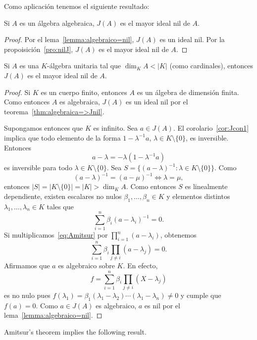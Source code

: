 Como aplicación tenemos el siguiente resultado:

\begin{theorem}
	\label{thm:algebraica=>Jnil}
	Si $A$ es un álgebra algebraica, $J(A)$ es el mayor ideal nil de $A$.
\end{theorem}

\begin{proof}
	Por el lema~\ref{lemma:algebraico=nil}, $J(A)$ es un ideal nil. Por la
	propoisición~\ref{pro:nilJ}, $J(A)$ es el mayor ideal nil de $A$.
\end{proof}

\begin{theorem}[Amitsur]
	\label{thm:Amitsur}
	Si $A$ es una $K$-álgebra unitaria tal que $\dim_KA<|K|$ (como cardinales),
	entonces $J(A)$ es el mayor ideal nil de $A$.
\end{theorem}

\begin{proof}
	Si $K$ es un cuerpo finito, entonces $A$ es un álgebra de dimensión finita.
	Como entonces $A$ es algebraica, $J(A)$ es un ideal nil por el
	teorema~\ref{thm:algebraica=>Jnil}.

	Supongamos entonces que $K$ es infinito. Sea $a\in J(A)$. El
	corolario~\ref{cor:Jcon1} implica que todo elemento de la forma
	$1-\lambda^{-1}a$, $\lambda\in K\setminus\{0\}$, es inversible. Entonces 
	\[
		a-\lambda=-\lambda(1-\lambda^{-1}a)
	\]
	es inversible para todo $\lambda\in K\setminus\{0\}$. Sea
	$S=\{(a-\lambda)^{-1}:\lambda\in K\setminus\{0\}\}$. Como
	\[
	(a-\lambda)^{-1}=(a-\mu)^{-1}\Longleftrightarrow\lambda=\mu,
	\]
	entonces $|S|=|K\setminus\{0\}|=|K|>\dim_KA$. Como entonces $S$ 
	es linealmente dependiente, 
	existen escalares no
	nulos $\beta_1,\dots,\beta_n\in K$ y elementos distintos $\lambda_1,\dots,\lambda_n\in K$ tales que
	\begin{equation}
		\label{eq:Amitsur}
		\sum_{i=1}^n \beta_i(a-\lambda_i)^{-1}=0.
	\end{equation}
	Si multiplicamos~\eqref{eq:Amitsur} por $\prod_{i=1}^n(a-\lambda_i)$, obtenemos
	\[
		\sum_{i=1}^n\beta_i\prod_{j\ne i}(a-\lambda_j)=0.
	\]
	Afirmamos que $a$ es algebraico sobre $K$. En efecto, 
	\[
		f=\sum_{i=1}^n\beta_i\prod_{j\ne i}(X-\lambda_j)
	\]
	es no nulo pues
	$f(\lambda_1)=\beta_1(\lambda_1-\lambda_2)\cdots(\lambda_1-\lambda_n)\ne0$
	y cumple que $f(a)=0$. Como $a\in J(A)$ es algebraico, $a$ es nil por el
	lema~\ref{lemma:algebraico=nil}.
\end{proof}

Amitsur's theorem implies the following result. 

